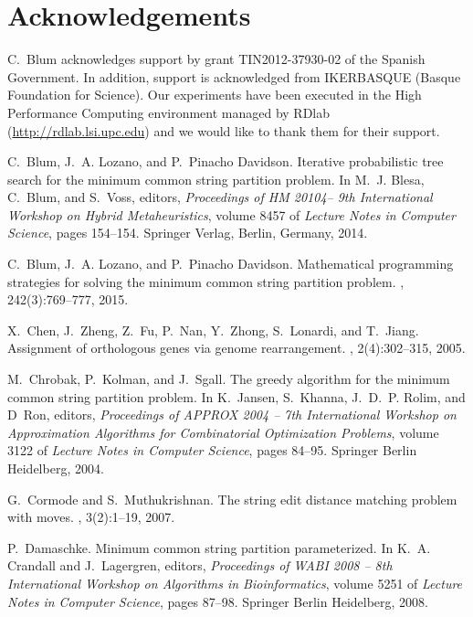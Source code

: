 \documentclass[11pt,a4paper]{article}
\begin{document}
\section*{Acknowledgements}
C.~Blum acknowledges support by grant TIN2012-37930-02 of the Spanish Government. In addition, support is acknowledged from IKERBASQUE (Basque Foundation for Science). Our experiments have been executed in the High Performance Computing environment managed by RDlab (\url{http://rdlab.lsi.upc.edu}) and we would like to thank them for their support.



\begin{thebibliography}{10}

C.~Blum, J.~A. Lozano, and P.~{Pinacho Davidson}.
\newblock Iterative probabilistic tree search for the minimum common string
  partition problem.
\newblock In M.~J. Blesa, C.~Blum, and S.~Voss, editors, {\em Proceedings of HM
  20104-- 9th International Workshop on Hybrid Metaheuristics}, volume 8457 of
  {\em Lecture Notes in Computer Science}, pages 154--154. Springer Verlag,
  Berlin, Germany, 2014.

C.~Blum, J.~A. Lozano, and P.~{Pinacho Davidson}.
\newblock Mathematical programming strategies for solving the minimum common
  string partition problem.
, 242(3):769--777,
  2015.

X.~Chen, J.~Zheng, Z.~Fu, P.~Nan, Y.~Zhong, S.~Lonardi, and T.~Jiang.
\newblock Assignment of orthologous genes via genome rearrangement.
,
  2(4):302--315, 2005.

M.~Chrobak, P.~Kolman, and J.~Sgall.
\newblock The greedy algorithm for the minimum common string partition problem.
\newblock In K.~Jansen, S.~Khanna, J.~D.~P. Rolim, and D~Ron, editors, {\em
  Proceedings of APPROX 2004 -- 7th International Workshop on Approximation
  Algorithms for Combinatorial Optimization Problems}, volume 3122 of {\em
  Lecture Notes in Computer Science}, pages 84--95. Springer Berlin Heidelberg,
  2004.

G.~Cormode and S.~Muthukrishnan.
\newblock The string edit distance matching problem with moves.
, 3(2):1--19, 2007.

P.~Damaschke.
\newblock Minimum common string partition parameterized.
\newblock In K.~A. Crandall and J.~Lagergren, editors, {\em Proceedings of WABI
  2008 -- 8th International Workshop on Algorithms in Bioinformatics}, volume
  5251 of {\em Lecture Notes in Computer Science}, pages 87--98. Springer
  Berlin Heidelberg, 2008.


\end{thebibliography}
\end{document}
